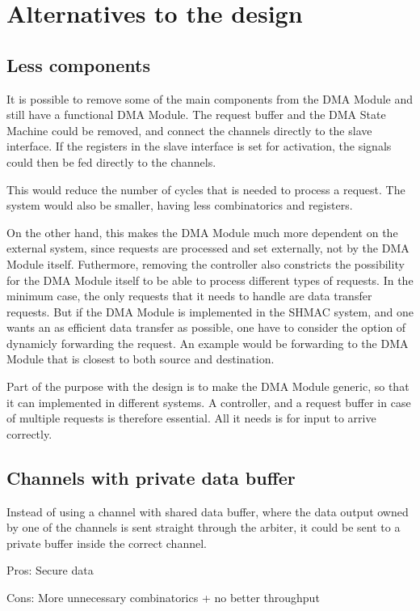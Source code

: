 \section{Alternatives to the design} 


\subsection{Less components}
It is possible to remove some of the main components from the DMA Module and still have a functional DMA Module.
The request buffer and the DMA State Machine could be removed, and connect the channels directly to the slave interface.
If the registers in the slave interface is set for activation, the signals could then be fed directly to the channels.

This would reduce the number of cycles that is needed to process a request.
The system would also be smaller, having less combinatorics and registers.

On the other hand, this makes the DMA Module much more dependent on the external system, since requests are processed and set externally, not by the DMA Module itself.
Futhermore, removing the controller also constricts the possibility for the DMA Module itself to be able to process different types of requests.
In the minimum case, the only requests that it needs to handle are data transfer requests.
But if the DMA Module is implemented in the SHMAC system, and one wants an as efficient data transfer as possible, one have to consider the option of dynamicly forwarding the request.
An example would be forwarding to the DMA Module that is  closest to both source and destination.

Part of the purpose with the design is to make the DMA Module generic, so that it can implemented in different systems.
A controller, and a request buffer in case of multiple requests is therefore essential.
All it needs is for input to arrive correctly.

\subsection{Channels with private data buffer}
Instead of using a channel with shared data buffer, where the data output owned by one of the channels is sent straight through the arbiter, it could be sent to a private buffer inside the correct channel.

Pros: Secure data

Cons: More unnecessary combinatorics + no better throughput